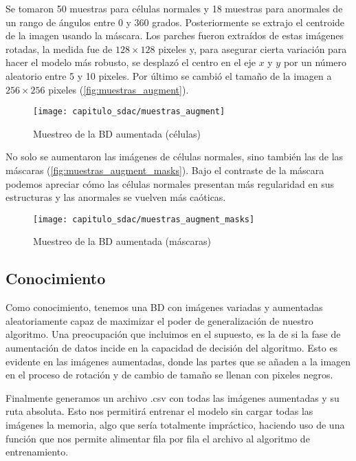Se tomaron 50 muestras para células normales y 18 muestras para anormales de un
rango de ángulos entre 0 y 360 grados. Posteriormente se extrajo el centroide de
la imagen usando la máscara. Los parches fueron extraídos de estas imágenes
rotadas, la medida fue de $128 \times 128$ pixeles y, para asegurar cierta
variación para hacer el modelo más robusto, se desplazó el centro en el eje $x$
y $y$ por un número aleatorio entre 5 y 10 pixeles. Por último se cambió el
tamaño de la imagen a $256 \times 256$ pixeles (\autoref{fig:muestras_augment}). 
  
\begin{figure}[H]
    \centering
    \texttt{[image: capitulo\_sdac/muestras\_augment]}
    \caption{Muestreo de la BD aumentada (células)}\label{fig:muestras_augment}
\end{figure}

No solo se aumentaron las imágenes de células normales, sino también las de las
máscaras (\autoref{fig:muestras_augment_masks}). Bajo el contraste de la máscara
podemos apreciar cómo las células normales presentan más regularidad en sus
estructuras y las anormales se vuelven más caóticas.

\begin{figure}[H]
    \centering
    \texttt{[image: capitulo\_sdac/muestras\_augment\_masks]}
    \caption{Muestreo de la BD aumentada (máscaras)}\label{fig:muestras_augment_masks}
\end{figure}

\subsection{Conocimiento}

Como conocimiento, tenemos una BD con imágenes variadas y aumentadas
aleatoriamente capaz de maximizar el poder de generalización de nuestro
algoritmo. Una preocupación que incluimos en el supuesto, es la de si la fase de
aumentación de datos incide en la capacidad de decisión del algoritmo. Esto es
evidente en las imágenes aumentadas, donde las partes que se añaden a la imagen
en el proceso de rotación y de cambio de tamaño se llenan con pixeles negros. 

Finalmente generamos un archivo .csv con todas las imágenes aumentadas y su ruta
absoluta. Esto nos permitirá entrenar el modelo sin cargar todas las imágenes la
memoria, algo que sería totalmente impráctico, haciendo uso de una función que
nos permite alimentar fila por fila el archivo al algoritmo de entrenamiento.
